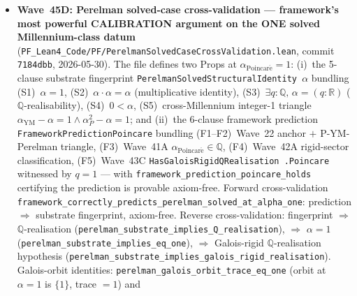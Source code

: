 \begin{itemize}
  bundles the chain, the sharpness equivalence
  \texttt{analyticPosBijection\_on\_wave38\_iff\_wave25\_completeness},
  the necessary-not-sufficient certificate
  \texttt{rh\_galois\_rigid\_necessary\_not\_sufficient} (Wave~43C
  honest-scope consistency), and three load-bearing cross-references
  \texttt{cite\_wave38A\_P5} / \texttt{cite\_wave43C\_galois\_rigid}
  / \texttt{cite\_wave25\_consciousness\_bridge\_on\_wave38}.
  \textasciitilde 413~lines, 0 project axioms; build clean 3242 jobs.
  Cited in Ch~\ref{ch:operator-theory}
  (\texttt{rem:consciousness-wave45c-lean}),
  Ch~\ref{ch:riemann-hypothesis} (\texttt{rem:rh-wave45c-lean}), and
  Ch~\ref{ch:observational-tests} (\texttt{rem:ch29-wave45c-lean}).
\item \textbf{Wave~45D: Perelman solved-case cross-validation ---
  framework's most powerful CALIBRATION argument on the ONE solved
  Millennium-class datum}
  (\texttt{PF\_Lean4\_Code/PF/PerelmanSolvedCaseCrossValidation.lean},
  commit \texttt{7184dbb}, 2026-05-30). The file defines two Props
  at $\alpha_{\mathrm{Poincar\acute{e}}} = 1$: (i)~the 5-clause
  substrate fingerprint \texttt{PerelmanSolvedStructuralIdentity
  $\alpha$} bundling (S1)~$\alpha = 1$, (S2)~$\alpha \cdot \alpha
  = \alpha$ (multiplicative identity), (S3)~$\exists q : \mathbb{Q},\,
  \alpha = (q : \mathbb{R})$ ($\mathbb{Q}$-realisability),
  (S4)~$0 < \alpha$, (S5)~cross-Millennium integer-1 triangle
  $\alpha_{\mathrm{YM}} - \alpha = 1 \wedge \alpha_P^2 - \alpha = 1$;
  and (ii)~the 6-clause framework prediction
  \texttt{FrameworkPredictionPoincare} bundling (F1--F2)~Wave~22
  anchor $+$ P-YM-Perelman triangle, (F3)~Wave~41A
  $\alpha_{\mathrm{Poincar\acute{e}}} \in \mathbb{Q}$,
  (F4)~Wave~42A rigid-sector classification, (F5)~Wave~43C
  \texttt{HasGaloisRigidQRealisation .Poincare} witnessed by
  $q = 1$ --- with \texttt{framework\_prediction\_poincare\_holds}
  certifying the prediction is provable axiom-free. Forward
  cross-validation
  \texttt{framework\_correctly\_predicts\_perelman\_solved\_at\_alpha\_one}:
  prediction $\Rightarrow$ substrate fingerprint, axiom-free.
  Reverse cross-validation: fingerprint $\Rightarrow$
  $\mathbb{Q}$-realisation
  (\texttt{perelman\_substrate\_implies\_Q\_realisation}),
  $\Rightarrow$ $\alpha = 1$
  (\texttt{perelman\_substrate\_implies\_eq\_one}), $\Rightarrow$
  Galois-rigid $\mathbb{Q}$-realisation hypothesis
  (\texttt{perelman\_substrate\_implies\_galois\_rigid\_realisation}).
  Galois-orbit identities: \texttt{perelman\_galois\_orbit\_trace\_eq\_one}
  (orbit at $\alpha = 1$ is $\{1\}$, trace $= 1$) and

\end{itemize}
